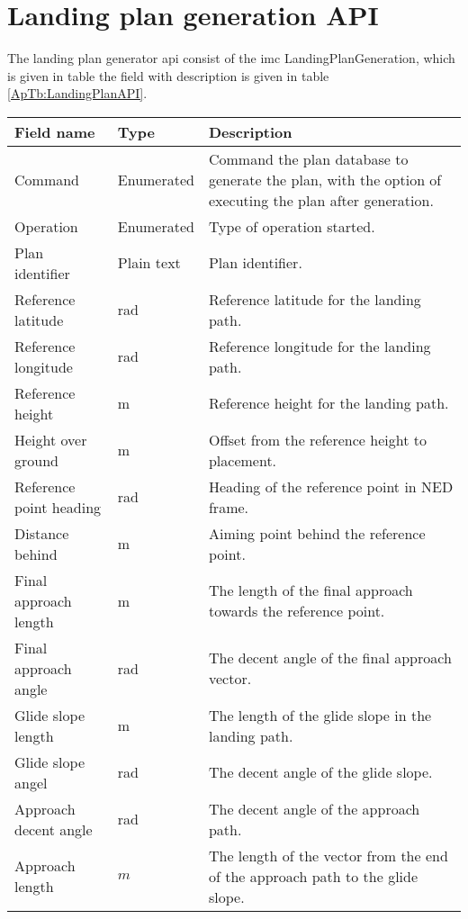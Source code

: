 \chapter{Landing plan generation API}\label{AP:APIIMC}
The landing plan generator \gls{api} consist of the \gls{imc} LandingPlanGeneration, which is given in table  the field with description is given in table \ref{ApTb:LandingPlanAPI}.
\begin{table}
\centering
\begin{tabular}{| p{4cm} | p{2cm} | p{6cm} |}
\hline
\textbf{Field name}	& \textbf{Type}	& \textbf{Description} \\ \hline
Command								& Enumerated	& Command the plan database to generate the plan, with the option of executing the plan after generation. \\ \hline
Operation							& Enumerated	& Type of operation started.	\\ \hline
Plan identifier						& Plain text	& Plan identifier.	\\ \hline
Reference latitude					& rad			& Reference latitude for the landing path.	\\ \hline
Reference longitude					& rad			& Reference longitude for the landing path.	\\ \hline
Reference height					& m				& Reference height for the landing path.	\\ \hline
Height over ground					& m				& Offset from the reference height to placement.	\\ \hline
Reference point heading				& rad			& Heading of the reference point in NED frame.	\\ \hline
Distance behind						& m				& Aiming point behind the reference point.	\\ \hline
Final approach length				& m				& The length of the final approach towards the reference point.	\\ \hline
Final approach angle				& rad			& The decent angle of the final approach vector. 	\\ \hline
Glide slope length					& m				& The length of the glide slope in the landing path.	\\ \hline
Glide slope angel					& rad			& The decent angle of the glide slope.	\\ \hline
Approach decent angle				& rad			& The decent angle of the approach path.	\\ \hline
Approach length						& $m$			& The length of the vector from the end of the approach path to the glide slope.	\\ \hline

\end{tabular}
\end{table}
